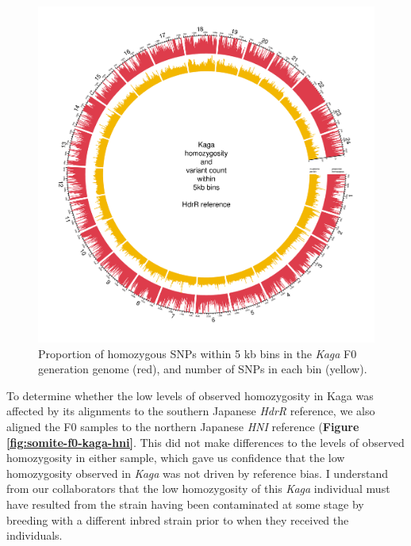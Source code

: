\documentclass[
]{book}
\begin{document}
\begin{figure}
\includegraphics[width=1\linewidth]{figs/somites/Kaga} \caption{Proportion of homozygous SNPs within 5 kb bins in the \emph{Kaga} F0 generation genome (red), and number of SNPs in each bin (yellow).}\label{fig:somite-f0-kaga}
\end{figure}

To determine whether the low levels of observed homozygosity in Kaga was affected by its alignments to the southern Japanese \emph{HdrR} reference, we also aligned the F0 samples to the northern Japanese \emph{HNI} reference (\textbf{Figure \ref{fig:somite-f0-kaga-hni}}. This did not make differences to the levels of observed homozygosity in either sample, which gave us confidence that the low homozygosity observed in \emph{Kaga} was not driven by reference bias. I understand from our collaborators that the low homozygosity of this \emph{Kaga} individual must have resulted from the strain having been contaminated at some stage by breeding with a different inbred strain prior to when they received the individuals.
\end{document}
